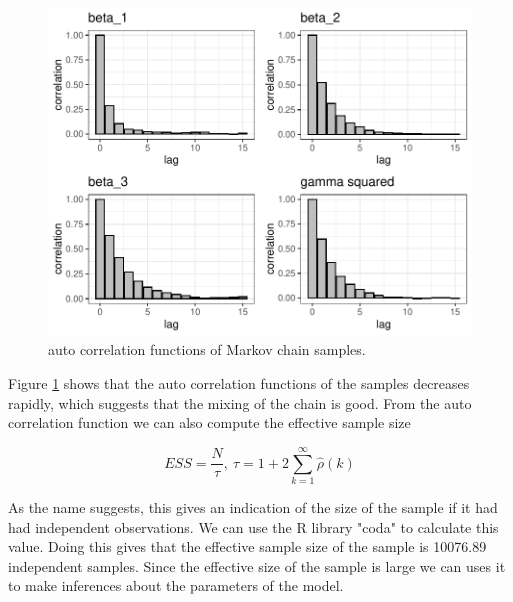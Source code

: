 \begin{figure}[H]
    \centering
    \includegraphics[width=\linewidth]{Images/ch3/MCMC_sample2_autocorrplot.pdf}
    \caption[MCMC1]{auto correlation functions of Markov chain samples.}
    \label{fig:MCMC2_autocorr}
\end{figure}

Figure \ref{fig:MCMC2_autocorr} shows that the auto correlation functions of the samples decreases rapidly, which suggests that the mixing of the chain is good. From the auto correlation function we can also compute the effective sample size \cite{kass_markov_1998}

$$
ESS = \frac{N}{\tau} , \ \tau = 1 + 2\sum_{k=1}^\infty \hat{\rho}(k)
$$

As the name suggests, this gives an indication of the size of the sample if it had had independent observations. We can use the R library "coda" to calculate this value. Doing this gives that the effective sample size of the sample is 10076.89 independent samples. Since the effective size of the sample is large we can uses it to make inferences about the parameters of the model. 


